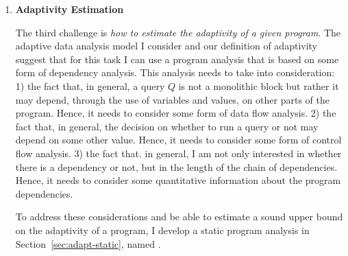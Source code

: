 \begin{enumerate}
\item 
\textbf{Adaptivity Estimation}

The third challenge is \emph{how to estimate the adaptivity of a given program}. 
The adaptive data analysis model I consider and our definition of adaptivity suggest that for this task 
I can use a program analysis that is based on some form of dependency analysis.
 This analysis needs to take into consideration:
1) the fact that, in general, a query $Q$ is not a monolithic block but rather it may depend, through the use of variables and values, on other parts of the program. 
Hence, it needs to consider some form of data flow analysis. 
2) the fact that, in general, the decision on whether to run a query or not may depend on some other value. Hence, 
 it needs to consider some form of control flow analysis.
3) the fact that. in general, I am not only interested in whether there is a dependency or not, but in the length of the chain of dependencies. 
Hence, it needs to consider some quantitative information about the program dependencies. %

To address these considerations and be able to estimate a sound upper bound on the adaptivity of a program, 
I develop a static program analysis in Section~\ref{sec:adapt-static}, named {\THESYSTEM}.
\end{enumerate}
